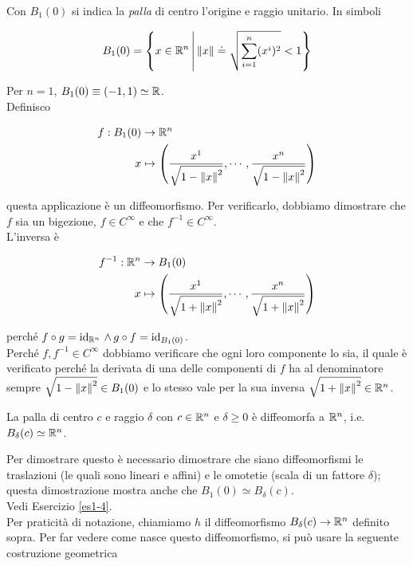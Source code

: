 Con $ B_{1} (0) $ si indica la \textit{palla} di centro l'origine e raggio unitario. In simboli

\begin{equation}
	B_{1} (0) = \left\{ x \in \mathbb{R}^{n} \, \middle| \, \norm{x} \doteq \sqrt{\sum_{i=1}^{n} (x^{i})^{2}} < 1 \right\}
\end{equation}

Per $ n=1 $, $ B_{1} (0) \equiv (-1,1) \simeq \mathbb{R} $.\\
Definisco

\begin{align}
	\begin{split}
		f : B_{1} (0) &\to \mathbb{R}^{n}\\
		x &\mapsto \left( \dfrac{x^{1}}{\sqrt{1 - \norm{x}^{2}}}, \cdots, \dfrac{x^{n}}{\sqrt{1 - \norm{x}^{2}}} \right)
	\end{split}	
\end{align}

questa applicazione è un diffeomorfismo. Per verificarlo, dobbiamo dimostrare che $ f $ sia un bigezione, $ f \in C^{\infty} $ e che $ f^{-1} \in C^{\infty} $.\\
L'inversa è

\begin{align}
	\begin{split}
		f^{-1} : \mathbb{R}^{n} &\to B_{1} (0)\\
		x &\mapsto \left( \dfrac{x^{1}}{\sqrt{1 + \norm{x}^{2}}}, \cdots, \dfrac{x^{n}}{\sqrt{1 + \norm{x}^{2}}} \right)
	\end{split}
\end{align}

perché $ f \circ g = \operatorname{id}_{\mathbb{R}^{n}} \, \wedge \, g \circ f = \operatorname{id}_{B_{1} (0)} $.\\
Perché $ f, f^{-1} \in C^{\infty} $ dobbiamo verificare che ogni loro componente lo sia, il quale è verificato perché la derivata di una delle componenti di $ f $ ha al denominatore sempre $ \sqrt{1 - \norm{x}^{2}} \in B_{1} (0) $ e lo stesso vale per la sua inversa $ \sqrt{1 + \norm{x}^{2}} \in \mathbb{R}^{n} $.

\begin{corollary}
	La palla di centro $ c $ e raggio $ \delta $ con $ c \in \mathbb{R}^{n} $ e $ \delta \geqslant 0 $ è diffeomorfa a $ \mathbb{R}^{n} $, i.e. $ B_{\delta} (c) \simeq \mathbb{R}^{n} $.
\end{corollary}

Per dimostrare questo è necessario dimostrare che siano diffeomorfismi le traslazioni (le quali sono lineari e affini) e le omotetie (scala di un fattore $ \delta $); questa dimostrazione mostra anche che $ B_{1} (0) \simeq B_{\delta} (c) $.\\
Vedi Esercizio \ref{es1-4}.\\
Per praticità di notazione, chiamiamo $ h $ il diffeomorfismo $ B_{\delta} (c) \to \mathbb{R}^{n} $ definito sopra. Per far vedere come nasce questo diffeomorfismo, si può usare la seguente costruzione geometrica

